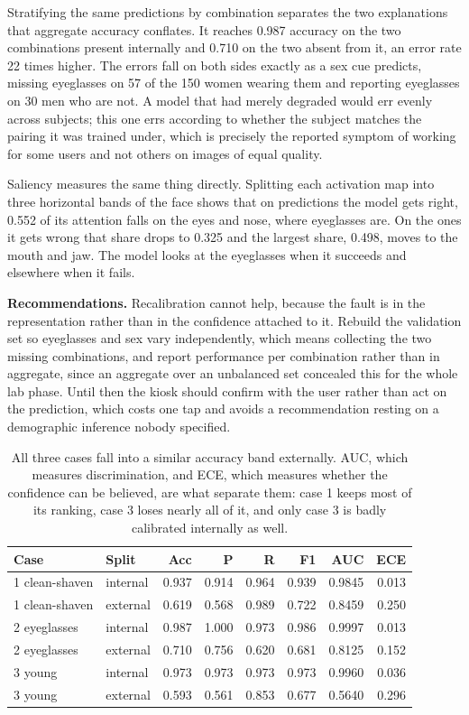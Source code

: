 \documentclass[10pt,a4paper,twocolumn]{article}
\begin{document}
Stratifying the same predictions by combination separates the two explanations that aggregate
accuracy conflates. It reaches 0.987 accuracy on the two combinations present
internally and 0.710 on the two absent from it, an error rate 22 times higher. The errors fall
on both sides exactly as a sex cue predicts, missing eyeglasses on 57 of the
150 women wearing them and reporting eyeglasses on 30 men who are not. A model that
had merely degraded would err evenly across subjects; this one errs according to whether the
subject matches the pairing it was trained under, which is precisely the reported symptom of
working for some users and not others on images of equal quality.

Saliency measures the same thing directly. Splitting each activation map into three horizontal
bands of the face shows that on predictions the model gets right, 0.552 of its
attention falls on the eyes and nose, where eyeglasses are. On the ones it gets wrong that share
drops to 0.325 and the largest share, 0.498, moves to the mouth and
jaw. The model looks at the eyeglasses when it succeeds and elsewhere when it fails.

\textbf{Recommendations.} Recalibration cannot help, because the fault is in the representation
rather than in the confidence attached to it. Rebuild the validation set so eyeglasses and sex vary
independently, which means collecting the two missing combinations, and report performance per
combination rather than in aggregate, since an aggregate over an unbalanced set concealed this for
the whole lab phase. Until then the kiosk should confirm with the user rather than act on the
prediction, which costs one tap and avoids a recommendation resting on a demographic inference
nobody specified.

\begin{table}[b]
\centering
\footnotesize
\setlength{\tabcolsep}{3pt}
\begin{tabular}{@{}llrrrrrr@{}}
\toprule
Case & Split & Acc & P & R & F1 & AUC & ECE \\
\midrule
1 clean-shaven & internal & 0.937 & 0.914 & 0.964 & 0.939 & 0.9845 & 0.013 \\
1 clean-shaven & external & 0.619 & 0.568 & 0.989 & 0.722 & 0.8459 & 0.250 \\
2 eyeglasses & internal & 0.987 & 1.000 & 0.973 & 0.986 & 0.9997 & 0.013 \\
2 eyeglasses & external & 0.710 & 0.756 & 0.620 & 0.681 & 0.8125 & 0.152 \\
3 young & internal & 0.973 & 0.973 & 0.973 & 0.973 & 0.9960 & 0.036 \\
3 young & external & 0.593 & 0.561 & 0.853 & 0.677 & 0.5640 & 0.296 \\
\bottomrule
\end{tabular}
\caption{All three cases fall into a similar accuracy band externally. AUC, which measures
discrimination, and ECE, which measures whether the confidence can be believed, are what separate
them: case 1 keeps most of its ranking, case 3 loses nearly all of it, and only case 3 is badly
calibrated internally as well.}
\end{table}
\end{document}
